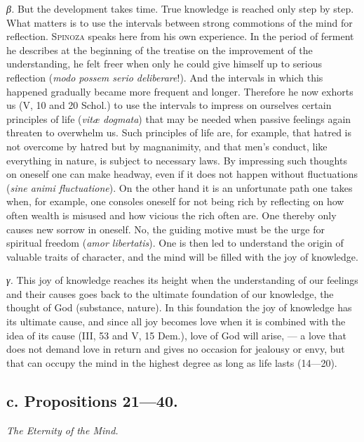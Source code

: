 \documentclass[12pt]{article}
\newcommand{\opage}[1]{\marginnote{\footnotesize\textit{[#1]}}}
\begin{document}
\textit{β.} But the development takes time. True knowledge is reached only step by step. What
matters is to use the intervals between strong commotions of the mind for reflection.
\textsc{Spinoza} speaks here from his own experience. In the period of ferment he describes at the
beginning of the treatise on the improvement of the understanding, he felt freer when only he could
give himself up to serious reflection (\textit{modo possem serio deliberare}!). And the intervals in
which this happened gradually became more frequent and longer. Therefore he now exhorts us (V, 10
and 20 Schol.) to use the intervals to impress on ourselves certain principles of life
(\textit{vitæ dogmata}) that may be needed when passive feelings again threaten to overwhelm us.
Such principles of life are, for example, that hatred is not overcome by hatred but by magnanimity,
and that men's conduct, like everything in nature, is subject to necessary laws. By impressing such
thoughts on oneself one can make headway, even if it does not happen without fluctuations
(\textit{sine animi fluctuatione}). On the other hand it is an unfortunate path one takes when, for
example, one consoles oneself for not being rich by reflecting on how often wealth is misused and
how vicious the rich often are. One thereby only causes new sorrow in oneself. No, the guiding
motive must be the urge for spiritual freedom (\textit{amor libertatis}). One is then led to
understand the origin of valuable traits of character, and the mind will be filled with the joy of
knowledge.

\textit{γ.} This joy of knowledge reaches its height when the understanding of our feelings and
their causes goes back to the ultimate foundation of our knowledge, \opage{89}the thought of God
(substance, nature). In this foundation the joy of knowledge has its ultimate cause, and since all
joy becomes love when it is combined with the idea of its cause (III, 53 and V, 15 Dem.), love of
God will arise, --- a love that does not demand love in return and gives no occasion for jealousy
or envy, but that can occupy the mind in the highest degree as long as life lasts (14---20).

\subsection*{c. Propositions 21---40.}
\begin{center}\textit{The Eternity of the Mind.}\end{center}
\end{document}
